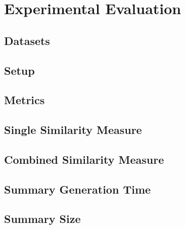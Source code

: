 


\chapter{Experimental Evaluation}
\label{chap:experimentalevaluation}
\pagestyle{plain}

\section{Datasets}

\section{Setup}

\section{Metrics}

\section{Single Similarity Measure}

\section{Combined Similarity Measure}

\section{Summary Generation Time}

\section{Summary Size}